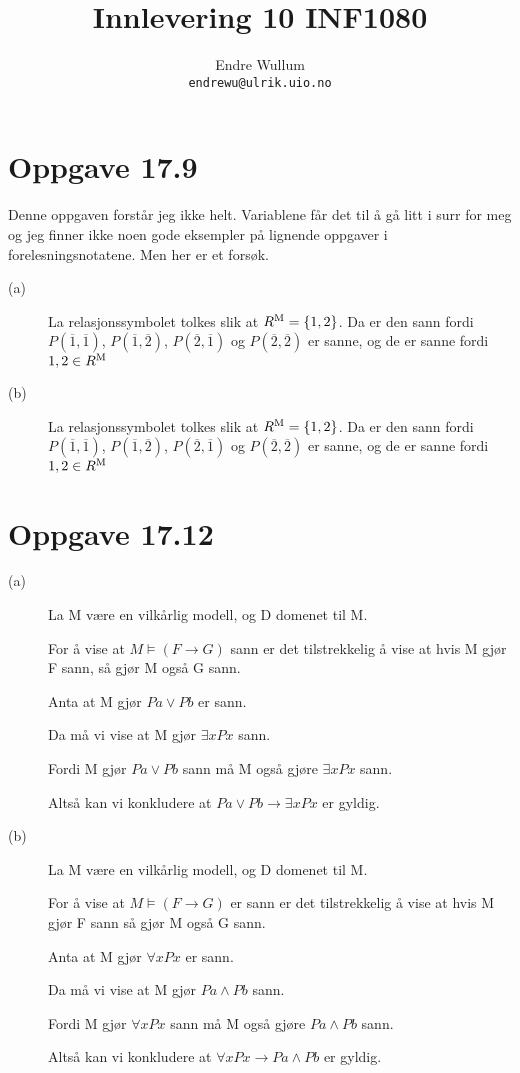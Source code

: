 \documentclass[12pt,norsk,a4paper]{article}
\title{Innlevering 10 INF1080}
\author{Endre Wullum\\ \texttt{endrewu@ulrik.uio.no}}
\begin{document}
\maketitle

\section*{Oppgave 17.9}
Denne oppgaven forstår jeg ikke helt. Variablene får det til å gå litt i surr for meg og jeg finner ikke noen gode eksempler på lignende oppgaver i forelesningsnotatene. Men her er et forsøk.
\begin{description}
\item[(a)]La relasjonssymbolet tolkes slik at $R\textsuperscript{M} = \{1, 2\}$. Da er den sann fordi $P(\overline{1}, \overline{1})$, $P(\overline{1}, \overline{2})$, $P(\overline{2}, \overline{1})$ og $P(\overline{2}, \overline{2})$ er sanne, og de er sanne fordi $1, 2 \in R\textsuperscript{M}$
\item[(b)]La relasjonssymbolet tolkes slik at $R\textsuperscript{M} = \{1, 2\}$. Da er den sann fordi $P(\overline{1}, \overline{1})$, $P(\overline{1}, \overline{2})$, $P(\overline{2}, \overline{1})$ og $P(\overline{2}, \overline{2})$ er sanne, og de er sanne fordi $1, 2 \in R\textsuperscript{M}$
\end{description}
\section*{Oppgave 17.12}
\begin{description}
\item[(a)]La M være en vilkårlig modell, og D domenet til M.

For å vise at $M \models (F \rightarrow G)$ sann er det tilstrekkelig å vise at hvis M gjør F sann, så gjør M også G sann.

Anta at M gjør $Pa \lor Pb$ er sann.

Da må vi vise at M gjør $\exists xPx$ sann.

Fordi M gjør $Pa \lor Pb$ sann må M også gjøre $\exists xPx$ sann.

Altså kan vi konkludere at $Pa \lor Pb \rightarrow \exists xPx$ er gyldig.
\item[(b)]La M være en vilkårlig modell, og D domenet til M.

For å vise at $M \models (F \rightarrow G)$ er sann er det tilstrekkelig å vise at hvis M gjør F sann så gjør M også G sann.

Anta at M gjør $\forall xPx$ er sann.

Da må vi vise at M gjør $Pa \land Pb$ sann.

Fordi M gjør $\forall xPx$ sann må M også gjøre $Pa \land Pb$ sann.

Altså kan vi konkludere at $\forall xPx \rightarrow Pa \land Pb$ er gyldig.
\end{description}



\end{document}
